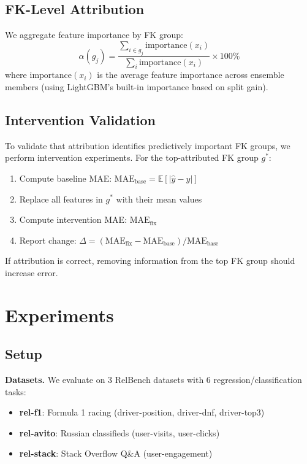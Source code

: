 \documentclass{article}
\begin{document}
\subsection{FK-Level Attribution}

We aggregate feature importance by FK group:
\begin{equation}
\alpha(g_j) = \frac{\sum_{i \in g_j} \text{importance}(x_i)}{\sum_{i} \text{importance}(x_i)} \times 100\%
\end{equation}
where $\text{importance}(x_i)$ is the average feature importance across ensemble members
(using LightGBM's built-in importance based on split gain).

\subsection{Intervention Validation}

To validate that attribution identifies predictively important FK groups, we perform
intervention experiments. For the top-attributed FK group $g^*$:
\begin{enumerate}
    \item Compute baseline MAE: $\text{MAE}_{\text{base}} = \mathbb{E}[|\hat{y} - y|]$
    \item Replace all features in $g^*$ with their mean values
    \item Compute intervention MAE: $\text{MAE}_{\text{fix}}$
    \item Report change: $\Delta = (\text{MAE}_{\text{fix}} - \text{MAE}_{\text{base}}) / \text{MAE}_{\text{base}}$
\end{enumerate}
If attribution is correct, removing information from the top FK group should increase error.

\section{Experiments}
\label{sec:experiments}

\subsection{Setup}

\textbf{Datasets.} We evaluate on 3 RelBench datasets with 6 regression/classification tasks:
\begin{itemize}
    \item \textbf{rel-f1}: Formula 1 racing (driver-position, driver-dnf, driver-top3)
    \item \textbf{rel-avito}: Russian classifieds (user-visits, user-clicks)
    \item \textbf{rel-stack}: Stack Overflow Q\&A (user-engagement)
\end{itemize}
\end{document}
